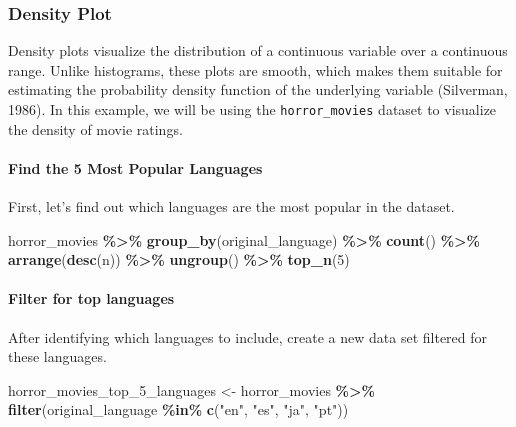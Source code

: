 \documentclass[
]{book}
\newenvironment{Shaded}{\begin{snugshade}}{\end{snugshade}}
\newcommand{\DecValTok}[1]{\textcolor[rgb]{0.00,0.00,0.81}{#1}}
\newcommand{\FunctionTok}[1]{\textcolor[rgb]{0.13,0.29,0.53}{\textbf{#1}}}
\newcommand{\NormalTok}[1]{#1}
\newcommand{\OtherTok}[1]{\textcolor[rgb]{0.56,0.35,0.01}{#1}}
\newcommand{\SpecialCharTok}[1]{\textcolor[rgb]{0.81,0.36,0.00}{\textbf{#1}}}
\newcommand{\StringTok}[1]{\textcolor[rgb]{0.31,0.60,0.02}{#1}}
\begin{document}
\subsubsection*{Density Plot}\label{density-plot}

Density plots visualize the distribution of a continuous variable over a continuous range. Unlike histograms, these plots are smooth, which makes them suitable for estimating the probability density function of the underlying variable (Silverman, 1986). In this example, we will be using the \texttt{horror\_movies} dataset to visualize the density of movie ratings.

\paragraph*{Find the 5 Most Popular Languages}\label{find-the-5-most-popular-languages}

First, let's find out which languages are the most popular in the dataset.

\begin{Shaded}
\begin{Highlighting}[]
\NormalTok{horror\_movies }\SpecialCharTok{\%\textgreater{}\%}
  \FunctionTok{group\_by}\NormalTok{(original\_language) }\SpecialCharTok{\%\textgreater{}\%}
  \FunctionTok{count}\NormalTok{() }\SpecialCharTok{\%\textgreater{}\%}
  \FunctionTok{arrange}\NormalTok{(}\FunctionTok{desc}\NormalTok{(n)) }\SpecialCharTok{\%\textgreater{}\%}
  \FunctionTok{ungroup}\NormalTok{() }\SpecialCharTok{\%\textgreater{}\%}
  \FunctionTok{top\_n}\NormalTok{(}\DecValTok{5}\NormalTok{)}
\end{Highlighting}
\end{Shaded}

\paragraph*{Filter for top languages}\label{filter-for-top-languages}

After identifying which languages to include, create a new data set filtered for these languages.

\begin{Shaded}
\begin{Highlighting}[]
\NormalTok{horror\_movies\_top\_5\_languages }\OtherTok{\textless{}{-}}\NormalTok{ horror\_movies }\SpecialCharTok{\%\textgreater{}\%}
  \FunctionTok{filter}\NormalTok{(original\_language }\SpecialCharTok{\%in\%} \FunctionTok{c}\NormalTok{(}\StringTok{"en"}\NormalTok{, }\StringTok{"es"}\NormalTok{, }\StringTok{"ja"}\NormalTok{, }\StringTok{"pt"}\NormalTok{))}
\end{Highlighting}
\end{Shaded}
\end{document}
